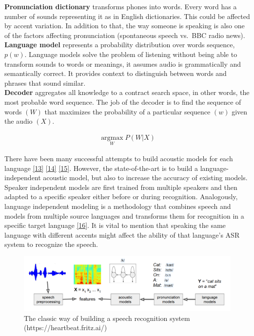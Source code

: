 \documentclass[
  a4paper,
]{article}
\begin{document}
\noindent 

\textbf{Pronunciation dictionary} transforms phones into words. Every
word has a number of sounds representing it as in English dictionaries.
This could be affected by accent variation. In addition to that, the way
someone is speaking is also one of the factors affecting pronunciation
(spontaneous speech vs.~BBC radio news).\\
\textbf{Language model} represents a probability distribution over words
sequence, \(p(w)\). Language models solve the problem of listening
without being able to transform sounds to words or meanings, it assumes
audio is grammatically and semantically correct. It provides context to
distinguish between words and phrases that sound similar.\\
\textbf{Decoder} aggregates all knowledge to a contract search space, in
other words, the most probable word sequence. The job of the decoder is
to find the sequence of words \((W)\) that maximizes the probability of
a particular sequence \((w)\) given the audio \((X)\).

\begin{align}
\underset{W}{\operatorname{argmax}} P(W|X)
\end{align}

There have been many successful attempts to build acoustic models for
each language \protect\hyperlink{ref-phdthesis}{{[}13{]}}
\protect\hyperlink{ref-inproceedings}{{[}14{]}}
\protect\hyperlink{ref-inproceedings1}{{[}15{]}}. However, the
state-of-the-art is to build a language-independent acoustic model, but
also to increase the accuracy of existing models. Speaker independent
models are first trained from multiple speakers and then adapted to a
specific speaker either before or during recognition. Analogously,
language independent modeling is a methodology that combines speech and
models from multiple source languages and transforms them for
recognition in a specific target language
\protect\hyperlink{ref-859138}{{[}16{]}}. It is vital to mention that
speaking the same language with different accents might affect the
ability of that language's ASR system to recognize the speech.

\begin{figure}

{\centering \includegraphics{classicway} 

}

\caption{The classic way of building a speech recognition system (https://heartbeat.fritz.ai/)}\label{fig:classicway}
\end{figure}
\end{document}
